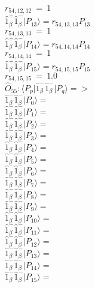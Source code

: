 \documentclass[14pt]{article}
\begin{document}
    ${r}_{54,12,12}\ =\ 1 $ \\ 
    $ \hat{1}_{\beta}^{+}\hat{1}_{\beta}^{-} \vert{P_{13}}\rangle = {r}_{54,13,13}P_{13} $ \\ 
    ${r}_{54,13,13}\ =\ 1 $ \\ 
    $ \hat{1}_{\beta}^{+}\hat{1}_{\beta}^{-} \vert{P_{14}}\rangle = {r}_{54,14,14}P_{14} $ \\ 
    ${r}_{54,14,14}\ =\ 1 $ \\ 
    $ \hat{1}_{\beta}^{+}\hat{1}_{\beta}^{-} \vert{P_{15}}\rangle = {r}_{54,15,15}P_{15} $ \\ 
    ${r}_{54,15,15}\ =\ 1.0 $ \\ 
    
    $\hat{O}_{55}:  \langle{P_p}\vert \hat{1}_{\beta}^{-}\hat{1}_{\beta}^{-} \vert{P_q}\rangle => $ \\ 
    $ \hat{1}_{\beta}^{-}\hat{1}_{\beta}^{-} \vert{P_{0}}\rangle =  $ \\ 
    $ \hat{1}_{\beta}^{-}\hat{1}_{\beta}^{-} \vert{P_{1}}\rangle =  $ \\ 
    $ \hat{1}_{\beta}^{-}\hat{1}_{\beta}^{-} \vert{P_{2}}\rangle =  $ \\ 
    $ \hat{1}_{\beta}^{-}\hat{1}_{\beta}^{-} \vert{P_{3}}\rangle =  $ \\ 
    $ \hat{1}_{\beta}^{-}\hat{1}_{\beta}^{-} \vert{P_{4}}\rangle =  $ \\ 
    $ \hat{1}_{\beta}^{-}\hat{1}_{\beta}^{-} \vert{P_{5}}\rangle =  $ \\ 
    $ \hat{1}_{\beta}^{-}\hat{1}_{\beta}^{-} \vert{P_{6}}\rangle =  $ \\ 
    $ \hat{1}_{\beta}^{-}\hat{1}_{\beta}^{-} \vert{P_{7}}\rangle =  $ \\ 
    $ \hat{1}_{\beta}^{-}\hat{1}_{\beta}^{-} \vert{P_{8}}\rangle =  $ \\ 
    $ \hat{1}_{\beta}^{-}\hat{1}_{\beta}^{-} \vert{P_{9}}\rangle =  $ \\ 
    $ \hat{1}_{\beta}^{-}\hat{1}_{\beta}^{-} \vert{P_{10}}\rangle =  $ \\ 
    $ \hat{1}_{\beta}^{-}\hat{1}_{\beta}^{-} \vert{P_{11}}\rangle =  $ \\ 
    $ \hat{1}_{\beta}^{-}\hat{1}_{\beta}^{-} \vert{P_{12}}\rangle =  $ \\ 
    $ \hat{1}_{\beta}^{-}\hat{1}_{\beta}^{-} \vert{P_{13}}\rangle =  $ \\ 
    $ \hat{1}_{\beta}^{-}\hat{1}_{\beta}^{-} \vert{P_{14}}\rangle =  $ \\ 
    $ \hat{1}_{\beta}^{-}\hat{1}_{\beta}^{-} \vert{P_{15}}\rangle =  $ \\ 
    
\end{document}
